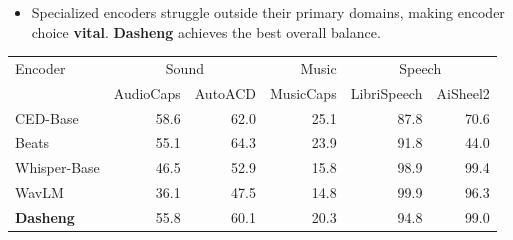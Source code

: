 \begin{itemize}
    \item Specialized encoders struggle outside their primary domains, making encoder choice \textbf{vital}. \textbf{Dasheng} achieves the best overall balance.
\end{itemize}
\vspace{1.0cm}
\begin{center}
\begin{tabular}{l|rr|r|rr}
\toprule
   Encoder & \multicolumn{2}{c|}{Sound} & Music & \multicolumn{2}{c}{Speech} \\
      &  AudioCaps & AutoACD & MusicCaps & LibriSpeech & AiSheel2 \\
\midrule
     CED-Base & 58.6 & 62.0 & 25.1 & 87.8 & 70.6 \\
     Beats & 55.1 & 64.3 & 23.9 & 91.8 & 44.0 \\
     Whisper-Base & 46.5 & 52.9 & 15.8 & 98.9 & 99.4 \\
     WavLM & 36.1 & 47.5 & 14.8 & 99.9 & 96.3 \\
     \hline
     \textbf{Dasheng} & 55.8 & 60.1 & 20.3 & 94.8 & 99.0 \\
\bottomrule
\end{tabular}
\end{center}
